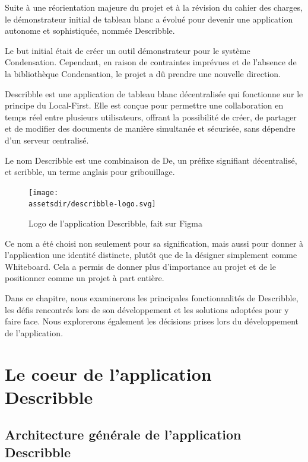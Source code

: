 Suite à une réorientation majeure du projet et à la révision du cahier des charges, le démonstrateur initial de tableau blanc a évolué pour devenir une application autonome et sophistiquée, nommée \Gls{Describble}.

Le but initial était de créer un outil démonstrateur pour le système Condensation. Cependant, en raison de contraintes imprévues et de l'absence de la bibliothèque Condensation, le projet a dû prendre une nouvelle direction.

\Gls{Describble} est une application de tableau blanc décentralisée qui fonctionne sur le principe du \guillemotleft Local-First\guillemotright. Elle est conçue pour permettre une collaboration en temps réel entre plusieurs utilisateurs, offrant la possibilité de créer, de partager et de modifier des documents de manière simultanée et sécurisée, sans dépendre d'un serveur centralisé.

Le nom \Gls{Describble} est une combinaison de \guillemotleft De\guillemotright, un préfixe signifiant décentralisé, et \guillemotleft scribble\guillemotright, un terme anglais pour gribouillage.

\begin{figure}[h]
    \centering
    \texttt{[image: \\assetsdir/describble-logo.svg]}
    \caption{Logo de l'application \Gls{Describble}, fait sur Figma}
\end{figure}

Ce nom a été choisi non seulement pour sa signification, mais aussi pour donner à l'application une identité distincte, plutôt que de la désigner simplement comme \guillemotleft Whiteboard\guillemotright. Cela a permis de donner plus d'importance au projet et de le positionner comme un projet à part entière.

Dans ce chapitre, nous examinerons les principales fonctionnalités de \Gls{Describble}, les défis rencontrés lors de son développement et les solutions adoptées pour y faire face. Nous explorerons également les décisions prises lors du développement de l'application.


\section{Le coeur de l'application Describble}

\subsection{Architecture générale de l'application Describble}

